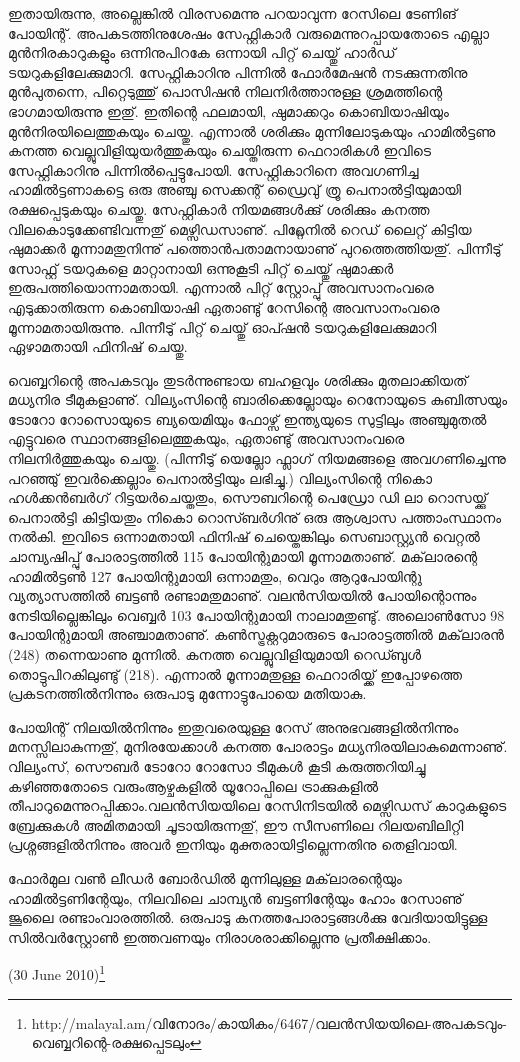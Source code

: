 ഇതായിരുന്നു, അല്ലെങ്കില്‍ വിരസമെന്നു പറയാവുന്ന റേസിലെ ടേണിങ് പോയിന്റ്. അപകടത്തിനുശേഷം സേഫ്റ്റികാര്‍ 
വരുമെന്നുറപ്പായതോടെ എല്ലാ മുന്‍നിരകാറുകളും ഒന്നിനുപിറകേ ഒന്നായി പിറ്റ് ചെയ്തു് ഹാര്‍ഡ് ടയറുകളിലേക്കുമാറി. 
സേഫ്റ്റികാറിനു പിന്നില്‍ ഫോര്‍മേഷന്‍ നടക്കുന്നതിനു മുന്‍പുതന്നെ, പിറ്റെടുത്തു് പൊസിഷന്‍ നിലനിര്‍ത്താനുള്ള 
ശ്രമത്തിന്റെ ഭാഗമായിരുന്നു ഇതു്. ഇതിന്റെ ഫലമായി, ഷുമാക്കറും കൊബിയാഷിയും മുന്‍നിരയിലെത്തുകയും ചെയ്തു. 
എന്നാല്‍ ശരിക്കും മുന്നിലോടുകയും ഹാമില്‍ട്ടണു കനത്ത വെല്ലുവിളിയുയര്‍ത്തുകയും ചെയ്തിരുന്ന ഫെറാരികള്‍ ഇവിടെ 
സേഫ്റ്റികാറിനു പിന്നില്‍പ്പെട്ടുപോയി. സേഫ്റ്റികാറിനെ അവഗണിച്ച ഹാമില്‍ട്ടണാകട്ടെ ഒരു അഞ്ചു സെക്കന്റ് ഡ്രൈവു് ത്രൂ 
പെനാല്‍ട്ടിയുമായി രക്ഷപ്പെടുകയും ചെയ്തു. സേഫ്റ്റികാര്‍ നിയമങ്ങള്‍ക്കു് ശരിക്കും കനത്ത വിലകൊടുക്കേണ്ടിവന്നതു് 
മെഴ്സിഡസാണു്. പിറ്റ്ലേനില്‍ റെഡ് ലൈറ്റ് കിട്ടിയ ഷുമാക്കര്‍ മൂന്നാമതുനിന്നു് പത്തൊന്‍പതാമനായാണു് പുറത്തെത്തിയതു്. 
പിന്നീടു് സോഫ്റ്റ് ടയറുകളെ മാറ്റാനായി ഒന്നുകൂടി പിറ്റ് ചെയ്തു് ഷുമാക്കര്‍ ഇരുപത്തിയൊന്നാമതായി. എന്നാല്‍ പിറ്റ് 
സ്റ്റോപ്പു് അവസാനംവരെ എടുക്കാതിരുന്ന കൊബിയാഷി ഏതാണ്ടു് റേസിന്റെ അവസാനംവരെ മൂന്നാമതായിരുന്നു. 
പിന്നീടു് പിറ്റ് ചെയ്തു് ഓപ്ഷന്‍ ടയറുകളിലേക്കുമാറി ഏഴാമതായി ഫിനിഷ് ചെയ്തു.

വെബ്ബറിന്റെ അപകടവും തുടര്‍ന്നുണ്ടായ ബഹളവും ശരിക്കും മുതലാക്കിയത് മധ്യനിര ടീമുകളാണു്. വില്യംസിന്റെ 
ബാരിക്കെല്ലോയും റെനോയുടെ കുബിത്സയും ടോറോ റോസൊയുടെ ബ്യയെമിയും ഫോഴ്സ് ഇന്ത്യയുടെ സുട്ടിലും 
അഞ്ചുമുതല്‍ എട്ടുവരെ സ്ഥാനങ്ങളിലെത്തുകയും, ഏതാണ്ടു് അവസാനംവരെ നിലനിര്‍ത്തുകയും ചെയ്തു. (പിന്നീടു് 
യെല്ലോ ഫ്ലാഗ് നിയമങ്ങളെ അവഗണിച്ചെന്നു പറഞ്ഞു് ഇവര്‍ക്കെല്ലാം പെനാല്‍ട്ടിയും ലഭിച്ചു.) വില്യംസിന്റെ നികൊ 
ഹള്‍ക്കന്‍ബര്‍ഗ് റിട്ടയര്‍ചെയ്തതും, സൌബറിന്റെ പെഡ്രോ ഡി ലാ റൊസയ്ക്കു് പെനാല്‍ട്ടി കിട്ടിയതും നികൊ 
റൊസ്ബര്‍ഗിനു് ഒരു ആശ്വാസ പത്താംസ്ഥാനം നല്‍കി. ഇവിടെ ഒന്നാമതായി ഫിനിഷ് ചെയ്തെങ്കിലും സെബാസ്റ്റ്യന്‍ 
വെറ്റല്‍ ചാമ്പ്യഷിപ്പു് പോരാട്ടത്തില്‍ 115 പോയിന്റുമായി മൂന്നാമതാണു്. മക്‌ലാരന്റെ ഹാമില്‍ട്ടണ്‍ 127 പോയിന്റുമായി 
ഒന്നാമതും, വെറും ആറുപോയിന്റു വ്യത്യാസത്തില്‍ ബട്ടണ്‍ രണ്ടാമതുമാണു്. വലന്‍സിയയില്‍ പോയിന്റൊന്നും 
നേടിയില്ലെങ്കിലും വെബ്ബര്‍ 103 പോയിന്റുമായി നാലാമതുണ്ടു്. അലൊണ്‍സോ 98 പോയിന്റുമായി അഞ്ചാമതാണു്. 
കണ്‍സ്ട്രക്റ്ററുമാരുടെ പോരാട്ടത്തില്‍ മക്‌ലാരന്‍ (248) തന്നെയാണു മുന്നില്‍. കനത്ത വെല്ലുവിളിയുമായി റെഡ്ബുള്‍ 
തൊട്ടുപിറകിലുണ്ടു് (218). എന്നാല്‍ മൂന്നാമതുള്ള ഫെറാരിയ്ക്ക് ഇപ്പോഴത്തെ പ്രകടനത്തില്‍നിന്നും 
ഒരുപാടു മുന്നോട്ടുപോയെ മതിയാകു.

പോയിന്റ് നിലയില്‍നിന്നും ഇതുവരെയുള്ള റേസ് അനുഭവങ്ങളില്‍നിന്നും മനസ്സിലാകുന്നതു്, മുനിരയേക്കാള്‍ കനത്ത 
പോരാട്ടം മധ്യനിരയിലാകുമെന്നാണു്. വില്യംസ്, സൌബര്‍ ടോറോ റോസോ ടീമുകള്‍ കൂടി കരുത്തറിയിച്ചു കഴിഞ്ഞതോടെ
വരുംആഴ്ചകളില്‍ യൂറോപ്പിലെ ട്രാക്കുകളില്‍ തീപാറുമെന്നുറപ്പിക്കാം.വലന്‍സിയയിലെ റേസിനിടയില്‍ മെഴ്സിഡസ് 
കാറുകളുടെ ബ്രേക്കുകള്‍ അമിതമായി ചൂടായിരുന്നതു്, ഈ സീസണിലെ റിലയബിലിറ്റി പ്രശ്നങ്ങളില്‍നിന്നും അവര്‍ ഇനിയും 
മുക്തരായിട്ടില്ലെന്നതിനു തെളിവായി.

ഫോര്‍മുല വണ്‍ ലീഡര്‍ ബോര്‍ഡില്‍ മുന്നിലുള്ള മക്‌ലാരന്റെയും ഹാമില്‍ട്ടണിന്റേയും, നിലവിലെ ചാമ്പ്യന്‍ ബട്ടണിന്റേയും
ഹോം റേസാണു് ജൂലൈ രണ്ടാംവാരത്തില്‍. ഒരുപാടു കനത്തപോരാട്ടങ്ങള്‍ക്കു വേദിയായിട്ടുള്ള സില്‍വര്‍സ്റ്റോണ്‍ 
ഇത്തവണയും നിരാശരാക്കില്ലെന്നു പ്രതീക്ഷിക്കാം.

(30 June 2010)\footnote{http://malayal.am/വിനോദം/കായികം/6467/വലന്‍സിയയിലെ-അപകടവും-വെബ്ബറിന്റെ-രക്ഷപ്പെടലും}

\newpage

